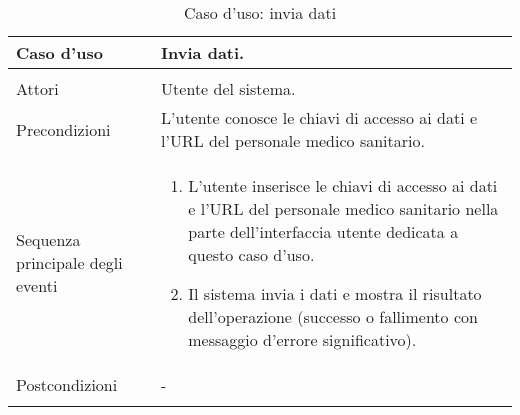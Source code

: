    \begin{table}
  \centering
  \begin{tabular}{p{} p{}}
  \\
  \hline
      Caso d'uso 
    & 
      Invia dati.
  \\
  \hline\\
      Attori
    &
      Utente del sistema. 
  \\
      Precondizioni
    &
      L'utente conosce le chiavi di accesso ai dati e l'URL del personale medico sanitario.
  \\
      Sequenza principale degli eventi
    &
      \begin{enumerate}
	\item
	  L'utente inserisce le chiavi di accesso ai dati e l'URL del personale medico sanitario nella parte dell'interfaccia utente dedicata a questo caso d'uso.
	\item
	  Il sistema invia i dati e mostra il risultato dell'operazione (successo o fallimento con messaggio d'errore significativo).
      \end{enumerate}
  \\
      Postcondizioni
    &
      -
  \\\\
  \hline
  \end{tabular}
   \caption{Caso d'uso: invia dati}
   \label{inviaDati}
   \end{table}





